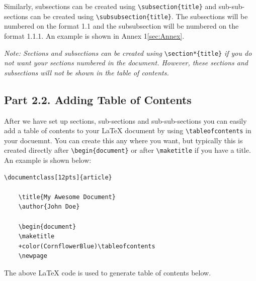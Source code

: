 \documentclass[12pts]{report}
\begin{document}
Similarly, subsections can be created using \verb|\subsection{title}| and sub-sub-sections can be created using \verb|\subsubsection{title}|. The subsections will be numbered on the format 1.1 and the subsubsection will be numbered on the format 1.1.1. An example is shown in Annex 1\ref{sec:Annex}. 

\textit{Note: Sections and subsections can be created using} \verb|\section*{title}| \textit{if you do not want your sections numbered in the document. However, these sections and subsections will not be shown in the table of contents.}


\clearpage
\subsection*{Part 2.2. Adding Table of Contents}

After we have set up sections, sub-sections and sub-sub-sections you can easily add a table of contents to your {\LaTeX} document by using \verb|\tableofcontents| in your docuemnt. You can create this any where you want, but typically this is created directly after \verb|\begin{document}| or after \verb|\maketitle| if you have a title.  An example is shown below:

\begin{Verbatim}[commandchars=+\(\)]
	\documentclass[12pts]{article}
	
	\title{My Awesome Document}
	\author{John Doe}
	
	\begin{document}
	\maketitle
	+color(CornflowerBlue)\tableofcontents
	\newpage

\end{Verbatim}
The above {\LaTeX} code is used to generate table of contents below.
\end{document}
